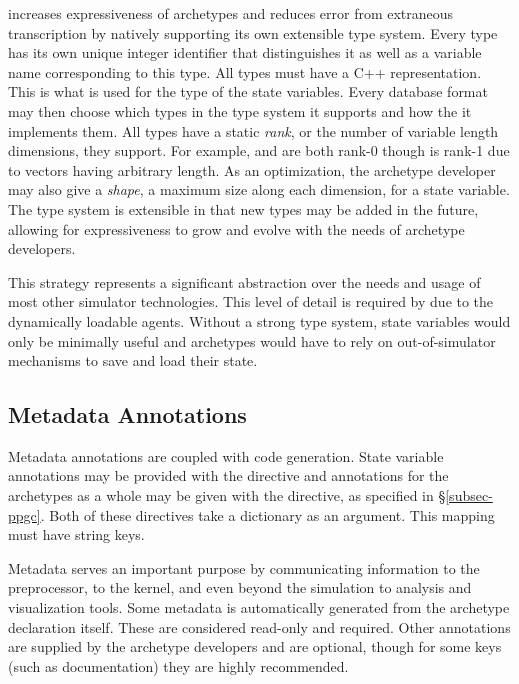 \Cyclus increases expressiveness of archetypes and reduces error from extraneous 
transcription by natively supporting its own extensible type system. Every type
has its own unique integer identifier that distinguishes it as well as 
a variable name corresponding to this type. All types
must have a C++ representation. This is what is used for the type of the state
variables. Every database format may then choose which types in the type system it 
supports and how the it implements them. All types have a static \emph{rank}, or the 
number of variable length dimensions, they support.  For example,  and 
 are both rank-0 though  is rank-1 due to 
vectors having arbitrary length. As an optimization, the archetype developer 
may also give a \emph{shape}, a maximum size along each dimension, for a state 
variable. The type system is extensible in that new types may be added in the future, 
allowing for expressiveness to grow and evolve with the needs of archetype developers.

This strategy represents a significant abstraction over the needs and usage of most 
other simulator technologies. This level of detail is required by \cyclus due to the
dynamically loadable agents. Without a strong type system, state variables 
would only be minimally useful and archetypes would have to rely on out-of-simulator
mechanisms to save and load their state.

\subsection{Metadata Annotations}

Metadata annotations are coupled with code generation.  State variable annotations
may be provided with the  directive and annotations for 
the archetypes as a whole may be given with the  directive,
as specified in \S \ref{subsec-ppgc}. Both of these directives take a dictionary 
as an argument. This mapping must have string keys.

Metadata serves an important purpose by communicating information to the \cyclus
preprocessor, to the \cyclus kernel, and even beyond the simulation to analysis 
and visualization tools. Some metadata is automatically generated from the 
archetype declaration itself.  These are considered read-only and required. 
Other annotations are supplied by the archetype developers and are optional, 
though for some keys (such as documentation) they are highly recommended.

